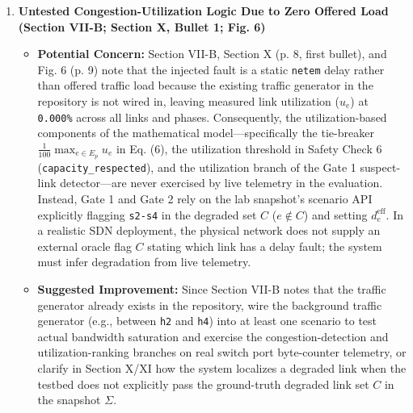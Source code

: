 \documentclass[11pt,a4paper]{article}
\begin{document}
\begin{enumerate}[leftmargin=1.6em,itemsep=3pt]
\item \textbf{Untested Congestion-Utilization Logic Due to Zero Offered Load (Section VII-B; Section X, Bullet 1; Fig. 6)}
\begin{itemize}[leftmargin=1.8em,itemsep=2pt]
\item \textbf{Potential Concern:} Section VII-B, Section X (p. 8, first bullet), and Fig. 6 (p. 9) note that the injected fault is a static \texttt{netem} delay rather than offered traffic load because the existing traffic generator in the repository is not wired in, leaving measured link utilization ($u_e$) at \texttt{0.000\%} across all links and phases. Consequently, the utilization-based components of the mathematical model—specifically the tie-breaker $\frac{1}{100}\max_{e \in E_p} u_e$ in Eq. (6), the utilization threshold in Safety Check 6 (\texttt{capacity\_respected}), and the utilization branch of the Gate 1 suspect-link detector—are never exercised by live telemetry in the evaluation. Instead, Gate 1 and Gate 2 rely on the lab snapshot's scenario API explicitly flagging \texttt{s2-s4} in the degraded set $C$ ($e \notin C$) and setting $d_e^{\text{eff}}$. In a realistic SDN deployment, the physical network does not supply an external oracle flag $C$ stating which link has a delay fault; the system must infer degradation from live telemetry.
\item \textbf{Suggested Improvement:} Since Section VII-B notes that the traffic generator already exists in the repository, wire the background traffic generator (e.g., between \texttt{h2} and \texttt{h4}) into at least one scenario to test actual bandwidth saturation and exercise the congestion-detection and utilization-ranking branches on real switch port byte-counter telemetry, or clarify in Section X/XI how the system localizes a degraded link when the testbed does not explicitly pass the ground-truth degraded link set $C$ in the snapshot $\Sigma$.
\end{itemize}
\end{enumerate}
\end{document}
